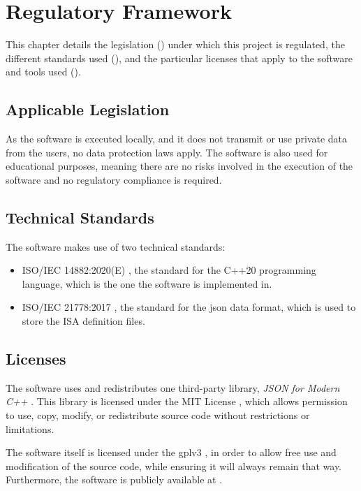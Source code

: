 \chapter{Regulatory Framework}\label{chap:regulation}
This chapter details the legislation () under which this project is regulated, the different standards used (), and the particular licenses that apply to the software and tools used ().


\section{Applicable Legislation}\label{sec:legislation}
As the software is executed locally, and it does not transmit or use private data from the users, no data protection laws apply. The software is also used for educational purposes, meaning there are no risks involved in the execution of the software and no regulatory compliance is required.



\section{Technical Standards}\label{sec:standards}
The software makes use of two technical standards:
\begin{itemize}
  \item ISO/IEC 14882:2020(E) \parencite{ISOcpp20}, the standard for the C++20 programming language, which is the one the software is implemented in.
  \item ISO/IEC 21778:2017 \parencite{ISO21778}, the standard for the \gls{json} data format, which is used to store the \gls{ISA} definition files.
\end{itemize}



\section{Licenses}\label{sec:licenses}
The software uses and redistributes one third-party library, \textit{JSON for Modern C++} \parencite{nlohmann/json}. This library is licensed under the MIT License \parencite{MITLicense}, which allows permission to use, copy, modify, or redistribute source code without restrictions or limitations.

The software itself is licensed under the \gls{gplv3} \parencite{gplv3}, in order to allow free use and modification of the source code, while ensuring it will always remain that way. Furthermore, the software is publicly available at \myrepo.
